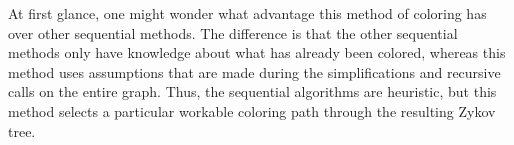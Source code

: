 At first glance, one might wonder what advantage this method of coloring has over other sequential methods.  The
difference is that the other sequential methods only have knowledge about what has already been colored, whereas
this method uses assumptions that are made during the simplifications and recursive calls on the entire graph.
Thus, the sequential algorithms are heuristic, but this method selects a particular workable coloring path through
the resulting Zykov tree.
